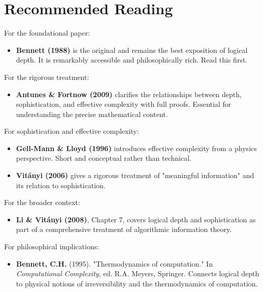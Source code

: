 \section{Recommended Reading}

For the foundational paper:

\begin{itemize}
\item \textbf{Bennett (1988)} is the original and remains the best exposition of logical depth. It is remarkably accessible and philosophically rich. Read this first.
\end{itemize}

For the rigorous treatment:

\begin{itemize}
\item \textbf{Antunes \& Fortnow (2009)} clarifies the relationships between depth, sophistication, and effective complexity with full proofs. Essential for understanding the precise mathematical content.
\end{itemize}

For sophistication and effective complexity:

\begin{itemize}
\item \textbf{Gell-Mann \& Lloyd (1996)} introduces effective complexity from a physics perspective. Short and conceptual rather than technical.
\end{itemize}

\begin{itemize}
\item \textbf{Vitányi (2006)} gives a rigorous treatment of "meaningful information" and its relation to sophistication.
\end{itemize}

For the broader context:

\begin{itemize}
\item \textbf{Li \& Vitányi (2008)}, Chapter 7, covers logical depth and sophistication as part of a comprehensive treatment of algorithmic information theory.
\end{itemize}

For philosophical implications:

\begin{itemize}
\item \textbf{Bennett, C.H.} (1995). "Thermodynamics of computation." In \textit{Computational Complexity}, ed. R.A. Meyers, Springer. Connects logical depth to physical notions of irreversibility and the thermodynamics of computation.
\end{itemize}

